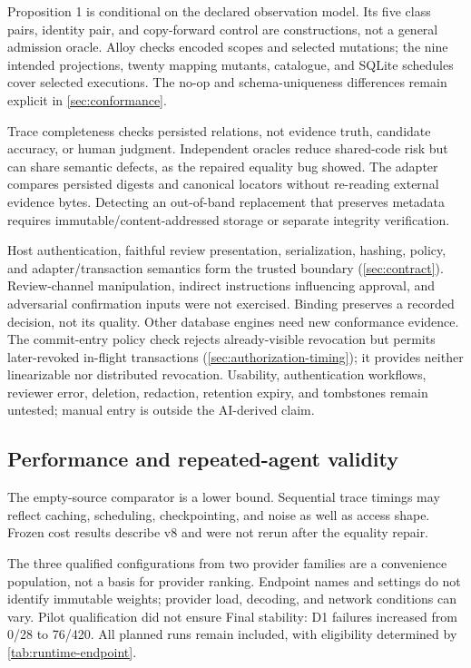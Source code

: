 Proposition 1 is conditional on the declared observation model. Its five class pairs, identity pair, and copy-forward control are constructions, not a general admission oracle. Alloy checks encoded scopes and selected mutations; the nine intended projections, twenty mapping mutants, catalogue, and SQLite schedules cover selected executions. The no-op and schema-uniqueness differences remain explicit in \cref{sec:conformance}.

Trace completeness checks persisted relations, not evidence truth, candidate accuracy, or human judgment. Independent oracles reduce shared-code risk but can share semantic defects, as the repaired equality bug showed. The adapter compares persisted digests and canonical locators without re-reading external evidence bytes. Detecting an out-of-band replacement that preserves metadata requires immutable/content-addressed storage or separate integrity verification.

Host authentication, faithful review presentation, serialization, hashing, policy, and adapter/transaction semantics form the trusted boundary (\cref{sec:contract}). Review-channel manipulation, indirect instructions influencing approval, and adversarial confirmation inputs were not exercised. Binding preserves a recorded decision, not its quality. Other database engines need new conformance evidence. The commit-entry policy check rejects already-visible revocation but permits later-revoked in-flight transactions (\cref{sec:authorization-timing}); it provides neither linearizable nor distributed revocation. Usability, authentication workflows, reviewer error, deletion, redaction, retention expiry, and tombstones remain untested; manual entry is outside the AI-derived claim.

\subsection{Performance and repeated-agent validity}

The empty-source comparator is a lower bound. Sequential trace timings may reflect caching, scheduling, checkpointing, and noise as well as access shape. Frozen cost results describe v8 and were not rerun after the equality repair.

The three qualified configurations from two provider families are a convenience population, not a basis for provider ranking. Endpoint names and settings do not identify immutable weights; provider load, decoding, and network conditions can vary. Pilot qualification did not ensure Final stability: D1 failures increased from 0/28 to 76/420. All planned runs remain included, with eligibility determined by \cref{tab:runtime-endpoint}.

